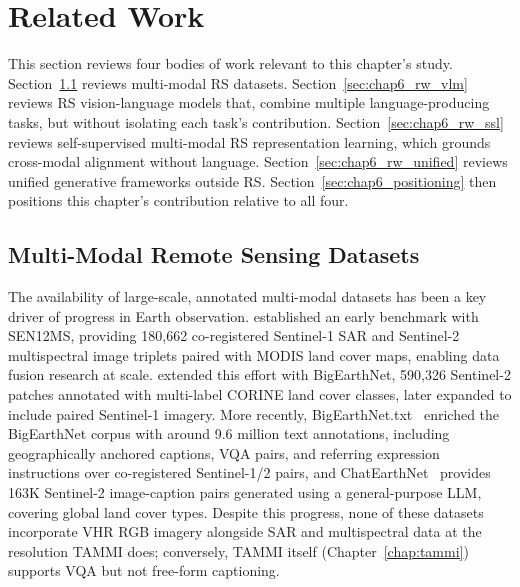 \section{Related Work}
\label{sec:chap6_related}

This section reviews four bodies of work relevant to this chapter's
study. Section~\ref{sec:chap6_rw_datasets} reviews multi-modal RS
datasets.
Section~\ref{sec:chap6_rw_vlm} reviews RS vision-language models that, combine multiple language-producing tasks, but
without isolating each task's contribution. Section~\ref{sec:chap6_rw_ssl}
reviews self-supervised multi-modal RS representation learning, which
grounds cross-modal alignment without language. Section~\ref{sec:chap6_rw_unified}
reviews unified generative frameworks outside RS. Section~\ref{sec:chap6_positioning}
then positions this chapter's contribution relative to all four.

\subsection{Multi-Modal Remote Sensing Datasets}
\label{sec:chap6_rw_datasets}

The availability of large-scale, annotated multi-modal datasets has
been a key driver of progress in Earth observation.
\textcite{schmitt2019sen12mscurateddataset} established an early benchmark with
SEN12MS, providing 180,662 co-registered Sentinel-1 SAR and Sentinel-2
multispectral image triplets paired with MODIS land cover maps, enabling
data fusion research at scale. \textcite{sumbul2019bigearthnet} extended
this effort with BigEarthNet, 590,326 Sentinel-2 patches annotated with
multi-label CORINE land cover classes, later expanded to include paired
Sentinel-1 imagery. More recently, BigEarthNet.txt~\cite{herzog2026bigearthnettxt}
enriched the BigEarthNet corpus with around 9.6 million text
annotations, including geographically anchored captions, VQA pairs, and
referring expression instructions over co-registered Sentinel-1/2
pairs, and ChatEarthNet~\cite{yuan2024chatearth} provides 163K
Sentinel-2 image-caption pairs generated using a general-purpose LLM,
covering global land cover types. Despite this progress, none of these
datasets incorporate VHR RGB imagery alongside SAR and multispectral
data at the resolution TAMMI does; conversely, TAMMI itself
(Chapter~\ref{chap:tammi}) supports VQA but not free-form captioning.

